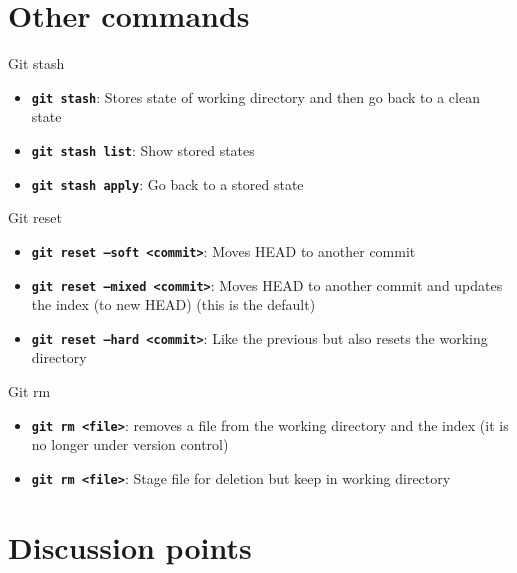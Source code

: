 \documentclass[12pt]{beamer}
\begin{document}
\section{Other commands}

\begin{frame}{Git stash}
	\begin{itemize}
		\item \textbf{\texttt{git stash}}: Stores state of working directory and then go back to a clean state
		\item \textbf{\texttt{git stash list}}: Show stored states
		\item \textbf{\texttt{git stash apply}}: Go back to a stored state
	\end{itemize}	
\end{frame}	

\begin{frame}{Git reset}
	\begin{itemize}
		\item \textbf{\texttt{git reset --soft <commit>}}: Moves HEAD to another commit
		\item \textbf{\texttt{git reset --mixed <commit>}}: Moves HEAD to another commit and updates the index (to new HEAD) (this is the default)
		\item \textbf{\texttt{git reset --hard <commit>}}: Like the previous but also resets the working directory
	\end{itemize}	
\end{frame}	

\begin{frame}{Git rm}
	\begin{itemize}
		\item \textbf{\texttt{git rm  <file>}}: removes a file from the working directory and the index (it is no longer under version control)
		\item \textbf{\texttt{git rm <file>}}: Stage file for deletion but keep in working directory
	\end{itemize}	
\end{frame}	

\section{Discussion points}
\end{document}
